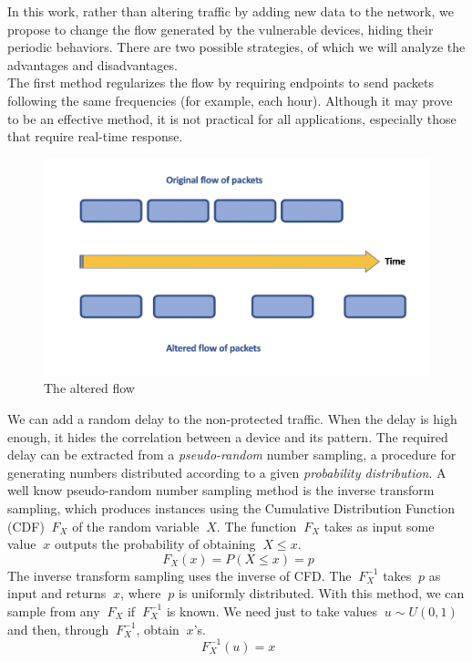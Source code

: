 In this work, rather than altering traffic by adding new data to the network, we propose to change the flow generated by the vulnerable devices, hiding their periodic behaviors. There are two possible strategies, of which we will analyze the advantages and disadvantages.
\\
The first method regularizes the flow by requiring endpoints to send packets following the same frequencies (for example, each hour). Although it may prove to be an effective method, it is not practical for all applications, especially those that require real-time response.
\begin{figure}[H]
    \centering
    \includegraphics[width=0.7\linewidth]{images/countermeasures/flow.png}
    \caption{The altered flow}
    \label{fig:flow}
\end{figure}
We can add a random delay to the non-protected traffic. When the delay is high enough, it hides the correlation between a device and its pattern. The required delay can be extracted from a \textit{pseudo-random} number sampling, a procedure for generating numbers distributed according to a given \textit{probability distribution}. A well know pseudo-random number sampling method is the inverse transform sampling, which produces instances using the Cumulative Distribution Function (CDF) \(\ F_{X} \) of the random variable \(\ X \). The function \(\ F_{X} \) takes as input some value \(\ x \) outputs the probability of obtaining \(\ X \leq x \). 
\[\ F_{X}(x) = P(X \leq x) = p \]
The inverse transform sampling uses the inverse of CFD. The \(\ F_{X}^{-1} \) takes \(\ p \) as input and returns \(\ x \), where \(\ p \) is uniformly distributed. With this method, we can sample from any \(\ F_{X} \) if \(\ F_{X}^{-1}  \) is known. We need just to take values \(\ u \sim U(0,1) \) and then, through \(\ F_{X}^{-1}  \), obtain \(\ x \)'s.
\[\ F_{X}^{-1}(u) = x \]

